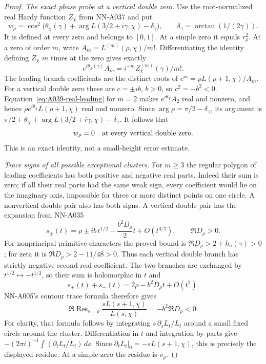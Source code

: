 \begin{proof}
\emph{The exact phase probe at a vertical double zero.}
Use the root-normalized real Hardy function $Z_\chi$ from NN-A037
and put
\[
 w_\rho=\cos^2\bigl(\theta_\chi(\gamma)
          +\arg L(3/2+i\gamma,\chi)-\delta_\gamma\bigr),
                     \qquad\delta_\gamma=\arctan(1/(2\gamma)).
\]
It is defined at every zero and belongs to $[0,1]$. At a simple
zero it equals $r_\rho^2$. At a zero of order $m$, write
$A_m=L^{(m)}(\rho,\chi)/m!$. Differentiating the identity defining
$Z_\chi$ $m$ times at the zero gives exactly
\begin{equation}\label{eq:A039-real-leading}
 e^{i\theta_\chi(\gamma)}A_m
            =i^{-m}Z_\chi^{(m)}(\gamma)/m!.
\end{equation}
The leading branch coefficients are the distinct roots of
$c^m=\rho L(\rho+1,\chi)/A_m$.
For a vertical double zero these are $c=\pm ib$, $b>0$,
so $c^2=-b^2<0$. Equation~\eqref{eq:A039-real-leading} for
$m=2$ makes $e^{i\theta_\chi}A_2$ real and nonzero, and hence
$\rho e^{i\theta_\chi}L(\rho+1,\chi)$ real and nonzero.
Since $\arg\rho=\pi/2-\delta_\gamma$, its argument is
$\pi/2+\theta_\chi+\arg L(3/2+i\gamma,\chi)-\delta_\gamma$.
It follows that
\begin{equation}\label{eq:A039-double-probe}
                         w_\rho=0
               \quad\hbox{at every vertical double zero}.
\end{equation}
This is an exact identity, not a small-height error estimate.

\emph{Trace signs of all possible exceptional clusters.}
For $m\ge3$ the regular polygon of leading coefficients has
both positive and negative real parts. Indeed their sum is
zero; if all their real parts had the same weak sign, every
coefficient would lie on the imaginary axis, impossible for
three or more distinct points on one circle. A nonvertical
double pair also has both signs. A vertical double pair has
the expansion from NN-A035
\[
 s_\pm(t)=\rho\pm ib\,t^{1/2}
                    -\frac{b^2D_\rho}{2}t+O(t^{3/2}),
                         \qquad\Re D_\rho>0.
\]
For nonprincipal primitive characters the proved bound is
$\Re D_\rho>2+h_a(\gamma)>0$; for zeta it is
$\Re D_\rho>2-11/48>0$. Thus each vertical double branch
has strictly negative second real coefficient.
The two branches are exchanged by $t^{1/2}\mapsto-t^{1/2}$,
so their sum is holomorphic in $t$ and
\[
             s_+(t)+s_-(t)=2\rho-b^2D_\rho t+O(t^2).
\]
NN-A005's contour trace formula therefore gives
\begin{equation}\label{eq:A039-double-trace}
 \Re\operatorname{Res}_{s=\rho}
               \frac{sL(s+1,\chi)}{L(s,\chi)}
                       =-b^2\Re D_\rho<0.
\end{equation}
For clarity, that formula follows by integrating
$s\,\partial_s L_t/L_t$ around a small fixed circle around
the cluster. Differentiation in $t$ and integration by parts
give $-(2\pi i)^{-1}\int(\partial_tL_t/L_t)\,ds$.
Since $\partial_tL_t|_0=-sL(s+1,\chi)$, this is precisely the
displayed residue. At a simple zero the residue is $v_\rho$.


\end{proof}
